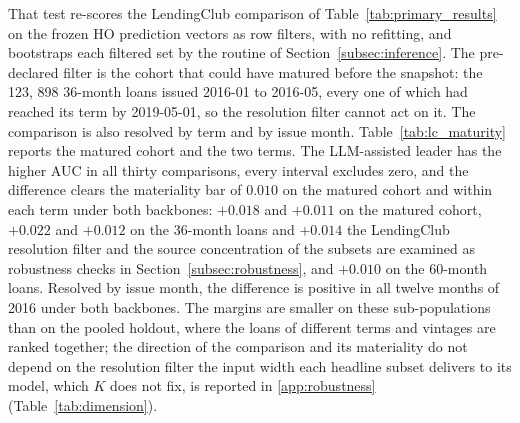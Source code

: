 \documentclass[final,5p,twocolumn]{elsarticle}
\newcommand{\Kfeat}{K}
\providecommand{\DIFaddtex}[1]{{\protect\color{blue} \sf #1}} %
\providecommand{\DIFdeltex}[1]{{\protect\color{red} \scriptsize #1}} %
\providecommand{\DIFaddbegin}{} %
\providecommand{\DIFaddend}{} %
\providecommand{\DIFdelbegin}{} %
\providecommand{\DIFdelend}{} %
\providecommand{\DIFadd}[1]{\texorpdfstring{\DIFaddtex{#1}}{#1}} %
\providecommand{\DIFdel}[1]{\texorpdfstring{\DIFdeltex{#1}}{}} %
\begin{document}
\DIFdel{That test re-scores the LendingClub comparison of Table~\ref{tab:primary_results} on the frozen HO prediction vectors as row filters, with no refitting, and bootstraps each filtered set by the routine of Section~\ref{subsec:inference}. The pre-declared filter is the cohort that could have matured before the snapshot: the 123}\DIFdelend , \DIFdelbegin \DIFdel{898 36-month loans issued 2016-01 to 2016-05, every one of which had reached its term by 2019-05-01, so the resolution filter cannot act on it. The comparison is also resolved by term and by issue month. Table~\ref{tab:lc_maturity} reports the matured cohort and the two terms. The LLM-assisted leader has the higher AUC in all thirty comparisons, every interval excludes zero, and the difference clears the materiality bar of $0.010$ on the matured cohort and within each term under both backbones: $+0.018$ and $+0.011$ on the matured cohort, $+0.022$ and $+0.012$ on the 36-month loans and $+0.014$ }\DIFdelend \DIFaddbegin \DIFadd{the LendingClub resolution filter and the source concentration of the subsets are examined as robustness checks in Section~\ref{subsec:robustness}, }\DIFaddend and \DIFdelbegin \DIFdel{$+0.010$ on the 60-month loans. Resolved by issue month, the difference is positive in all twelve months of 2016 under both backbones. The margins are smaller on these sub-populations than on the pooled holdout, where the loans of different terms and vintages are ranked together; the direction of the comparison and its materiality do not depend on the resolution filter}\DIFdelend \DIFaddbegin \DIFadd{the input width each headline subset delivers to its model, which $\Kfeat$ does not fix, is reported in \ref{app:robustness} (Table~\ref{tab:dimension})}\DIFaddend .
\end{document}
